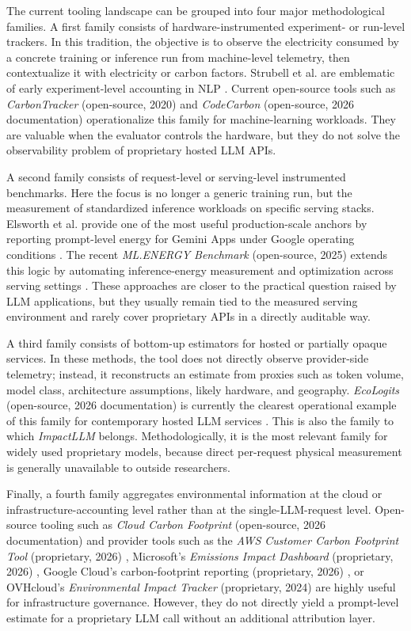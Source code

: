 \documentclass[11pt,a4paper]{article}
\begin{document}
The current tooling landscape can be grouped into four major methodological families. A first family consists of hardware-instrumented experiment- or run-level trackers. In this tradition, the objective is to observe the electricity consumed by a concrete training or inference run from machine-level telemetry, then contextualize it with electricity or carbon factors. Strubell et al. are emblematic of early experiment-level accounting in NLP \cite{strubell2019}. Current open-source tools such as \emph{CarbonTracker} (open-source, 2020) \cite{anthony2020carbontracker} and \emph{CodeCarbon} (open-source, 2026 documentation) \cite{codecarbon2026} operationalize this family for machine-learning workloads. They are valuable when the evaluator controls the hardware, but they do not solve the observability problem of proprietary hosted LLM APIs.

A second family consists of request-level or serving-level instrumented benchmarks. Here the focus is no longer a generic training run, but the measurement of standardized inference workloads on specific serving stacks. Elsworth et al. provide one of the most useful production-scale anchors by reporting prompt-level energy for Gemini Apps under Google operating conditions \cite{elsworth2025}. The recent \emph{ML.ENERGY Benchmark} (open-source, 2025) extends this logic by automating inference-energy measurement and optimization across serving settings \cite{mlenergy2025}. These approaches are closer to the practical question raised by LLM applications, but they usually remain tied to the measured serving environment and rarely cover proprietary APIs in a directly auditable way.

A third family consists of bottom-up estimators for hosted or partially opaque services. In these methods, the tool does not directly observe provider-side telemetry; instead, it reconstructs an estimate from proxies such as token volume, model class, architecture assumptions, likely hardware, and geography. \emph{EcoLogits} (open-source, 2026 documentation) is currently the clearest operational example of this family for contemporary hosted LLM services \cite{ecologits2026}. This is also the family to which \emph{ImpactLLM} belongs. Methodologically, it is the most relevant family for widely used proprietary models, because direct per-request physical measurement is generally unavailable to outside researchers.

Finally, a fourth family aggregates environmental information at the cloud or infrastructure-accounting level rather than at the single-LLM-request level. Open-source tooling such as \emph{Cloud Carbon Footprint} (open-source, 2026 documentation) \cite{cloudcarbonfootprint2026} and provider tools such as the \emph{AWS Customer Carbon Footprint Tool} (proprietary, 2026) \cite{awsccft2026}, Microsoft's \emph{Emissions Impact Dashboard} (proprietary, 2026) \cite{azureeid2026}, Google Cloud's carbon-footprint reporting (proprietary, 2026) \cite{gcloudcarbon2026}, or OVHcloud's \emph{Environmental Impact Tracker} (proprietary, 2024) \cite{ovhtracker2024} are highly useful for infrastructure governance. However, they do not directly yield a prompt-level estimate for a proprietary LLM call without an additional attribution layer.
\end{document}
